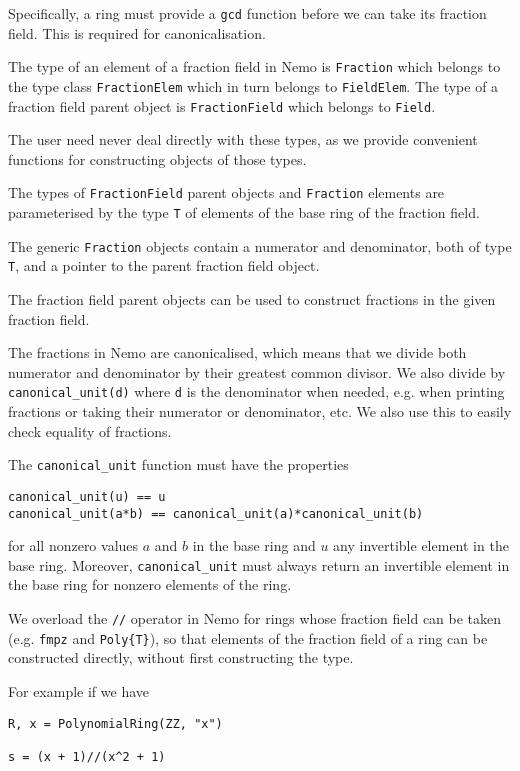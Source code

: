 \documentclass[a4paper,10pt]{article}
\newcommand{\code}{\lstinline}
\begin{document}
Specifically, a ring must provide a \code{gcd} function before we can take its
fraction field. This is required for canonicalisation.

The type of an element of a fraction field in Nemo is \code{Fraction} which
belongs to the type class \code{FractionElem} which in turn belongs to
\code{FieldElem}. The type of a fraction field parent object is
\code{FractionField} which belongs to \code{Field}.

The user need never deal directly with these types, as we provide convenient
functions for constructing objects of those types.

The types of \code{FractionField} parent objects and \code{Fraction} elements
are parameterised by the type \code{T} of elements of the base ring of the
fraction field.

The generic \code{Fraction} objects contain a numerator and denominator, both
of type \code{T}, and a pointer to the parent fraction field object.

The fraction field parent objects can be used to construct fractions in the
given fraction field.

The fractions in Nemo are canonicalised, which means that we divide both
numerator and denominator by their greatest common divisor. We also divide
by \code{canonical_unit(d)} where \code{d} is the denominator when needed,
e.g. when printing fractions or taking their numerator or denominator, etc.
We also use this to easily check equality of fractions.

The \code{canonical_unit} function must have the properties

\begin{lstlisting}
canonical_unit(u) == u
canonical_unit(a*b) == canonical_unit(a)*canonical_unit(b)
\end{lstlisting}

for all nonzero values $a$ and $b$ in the base ring and $u$ any invertible element
in the base ring. Moreover, \code{canonical_unit} must always return an invertible
element in the base ring for nonzero elements of the ring.

We overload the \code{//} operator in Nemo for rings whose fraction field can
be taken (e.g. \code{fmpz} and \code|Poly{T}|), so that elements of the
fraction field of a ring can be constructed directly, without first
constructing the type.

For example if we have

\begin{lstlisting}
R, x = PolynomialRing(ZZ, "x")

s = (x + 1)//(x^2 + 1)
\end{lstlisting}
\end{document}
